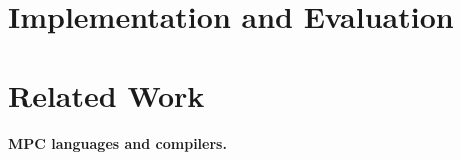 \documentclass[sigconf, screen, natbib=false, dvipsnames, table]{acmart}
\theoremstyle{definition}
\begin{document}

\section{Implementation and Evaluation}
\label{sec:implementation}

\section{Related Work}
\label{sec:related}

\paragraph{MPC languages and compilers.}
\end{document}
